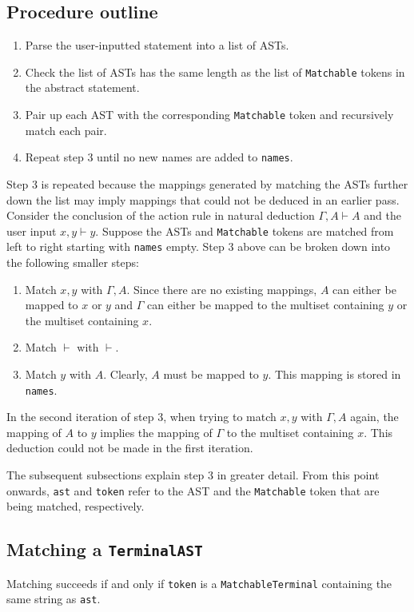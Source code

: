\subsection{Procedure outline}
\label{matching:procedure}
\begin{enumerate}
    \item Parse the user-inputted statement into a list of ASTs.
    \item Check the list of ASTs has the same length as the list of \lstinline{Matchable} tokens in the abstract statement.
    \item Pair up each AST with the corresponding \lstinline{Matchable} token and recursively match each pair.
    \item Repeat step 3 until no new names are added to \lstinline{names}.
\end{enumerate}
Step 3 is repeated because the mappings generated by matching the ASTs further down the list may imply mappings that could not be deduced in an earlier pass. Consider the conclusion of the action rule in natural deduction $\Gamma, A \vdash A$ and the user input $x, y \vdash y$. Suppose the ASTs and \lstinline{Matchable} tokens are matched from left to right starting with \lstinline{names} empty. Step 3 above can be broken down into the following smaller steps:
\begin{enumerate}
    \item Match $x, y$ with $\Gamma, A$. Since there are no existing mappings, $A$ can either be mapped to $x$ or $y$ and $\Gamma$ can either be mapped to the multiset containing $y$ or the multiset containing $x$.
    \item Match $\vdash$ with $\vdash$.
    \item Match $y$ with $A$. Clearly, $A$ must be mapped to $y$. This mapping is stored in \lstinline{names}.
\end{enumerate}
In the second iteration of step 3, when trying to match $x, y$ with $\Gamma, A$ again, the mapping of $A$ to $y$ implies the mapping of $\Gamma$ to the multiset containing $x$. This deduction could not be made in the first iteration.

The subsequent subsections explain step 3 in greater detail. From this point onwards, \lstinline{ast} and \lstinline{token} refer to the AST and the \lstinline{Matchable} token that are being matched, respectively.

\subsection{Matching a \texorpdfstring{\lstinline{TerminalAST}}{TerminalAST}}
Matching succeeds if and only if \lstinline{token} is a \lstinline{MatchableTerminal} containing the same string as \lstinline{ast}.

